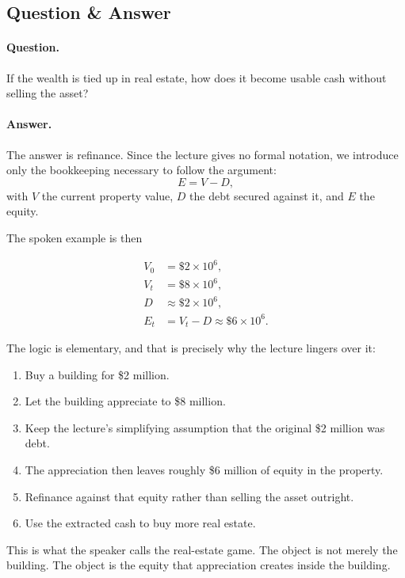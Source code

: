 \subsection{Question \& Answer}

\paragraph{Question.}
If the wealth is tied up in real estate, how does it become usable cash without selling the asset?

\paragraph{Answer.}
The answer is refinance. Since the lecture gives no formal notation, we introduce only the bookkeeping necessary to follow the argument:
\begin{equation}
E = V - D,
\end{equation}
with \(V\) the current property value, \(D\) the debt secured against it, and \(E\) the equity.

The spoken example is then

\begin{align}
V_0 &= \$2 \times 10^6,\\
V_t &= \$8 \times 10^6,\\
D &\approx \$2 \times 10^6,\\
E_t &= V_t - D \approx \$6 \times 10^6.
\end{align}

The logic is elementary, and that is precisely why the lecture lingers over it:
\begin{enumerate}
\item Buy a building for \$2 million.
\item Let the building appreciate to \$8 million.
\item Keep the lecture's simplifying assumption that the original \$2 million was debt.
\item The appreciation then leaves roughly \$6 million of equity in the property.
\item Refinance against that equity rather than selling the asset outright.
\item Use the extracted cash to buy more real estate.
\end{enumerate}

This is what the speaker calls the real-estate game. The object is not merely the building. The object is the equity that appreciation creates inside the building.

